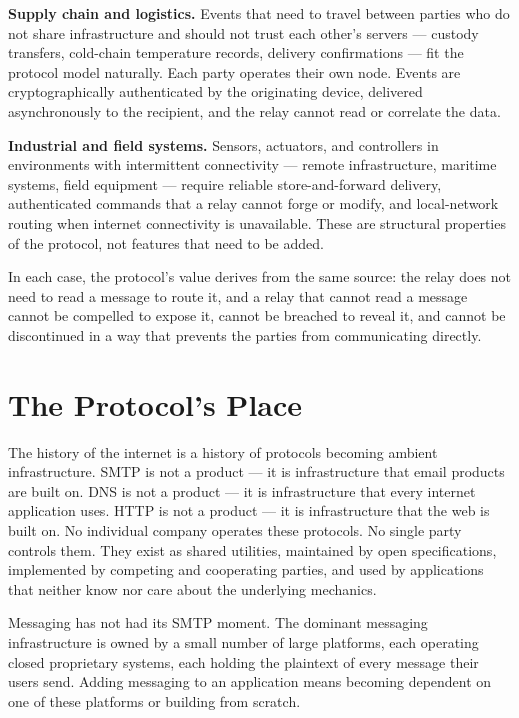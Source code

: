 \documentclass[11pt, a4paper]{article}
\begin{document}
\textbf{Supply chain and logistics.} Events that need to travel between parties who do not share infrastructure and should not trust each other's servers — custody transfers, cold-chain temperature records, delivery confirmations — fit the protocol model naturally. Each party operates their own node. Events are cryptographically authenticated by the originating device, delivered asynchronously to the recipient, and the relay cannot read or correlate the data.

\textbf{Industrial and field systems.} Sensors, actuators, and controllers in environments with intermittent connectivity — remote infrastructure, maritime systems, field equipment — require reliable store-and-forward delivery, authenticated commands that a relay cannot forge or modify, and local-network routing when internet connectivity is unavailable. These are structural properties of the protocol, not features that need to be added.

In each case, the protocol's value derives from the same source: the relay does not need to read a message to route it, and a relay that cannot read a message cannot be compelled to expose it, cannot be breached to reveal it, and cannot be discontinued in a way that prevents the parties from communicating directly.

\section{The Protocol's Place}

The history of the internet is a history of protocols becoming ambient infrastructure. SMTP is not a product — it is infrastructure that email products are built on. DNS is not a product — it is infrastructure that every internet application uses. HTTP is not a product — it is infrastructure that the web is built on. No individual company operates these protocols. No single party controls them. They exist as shared utilities, maintained by open specifications, implemented by competing and cooperating parties, and used by applications that neither know nor care about the underlying mechanics.

Messaging has not had its SMTP moment. The dominant messaging infrastructure is owned by a small number of large platforms, each operating closed proprietary systems, each holding the plaintext of every message their users send. Adding messaging to an application means becoming dependent on one of these platforms or building from scratch.
\end{document}
